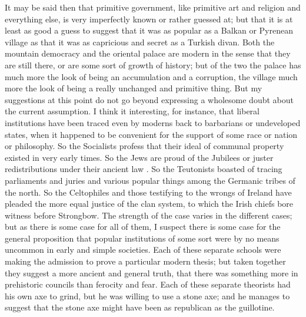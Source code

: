 It may be said then that primitive government, like primitive art and religion and everything else, is very imperfectly known or rather guessed at; but that it is at least as good a guess to suggest that it was as popular as a Balkan or Pyrenean village as that it was as capricious and secret as a Turkish divan. Both the mountain democracy and the oriental palace are modern in the sense that they are still there, or are some sort of growth of history; but of the two the palace has much more the look of being an accumulation and a corruption, the village much more the look of being a really unchanged and primitive thing. But my suggestions at this point do not go beyond expressing a wholesome doubt about the current assumption. I think it interesting, for instance, that liberal institutions have been traced even by moderns back to barbarians or undeveloped states, when it happened to be convenient for the support of some race or nation or philosophy. So the Socialists profess that their ideal of communal property existed in very early times. So the Jews are proud of the Jubilees or juster redistributions under their ancient law . So the Teutonists boasted of tracing parliaments and juries and various popular things among the Germanic tribes of the north. So the Celtophiles and those testifying to the wrongs of Ireland have pleaded the more equal justice of the clan system, to which the Irish chiefs bore witness before Strongbow. The strength of the case varies in the different cases; but as there is some case for all of them, I suspect there is some case for the general proposition that popular institutions of some sort were by no means uncommon in early and simple societies. Each of these separate schools were making the admission to prove a particular modern thesis; but taken together they suggest a more ancient and general truth, that there was something more in prehistoric councils than ferocity and fear. Each of these separate theorists had his own axe to grind, but he was willing to use a stone axe; and he manages to suggest that the stone axe might have been as republican as the guillotine.

